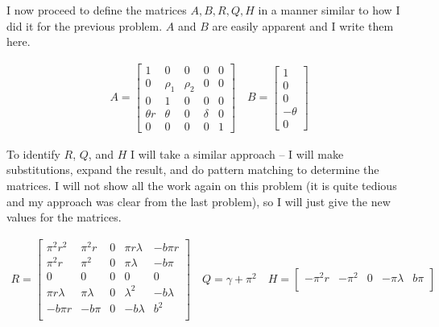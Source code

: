 \begin{homeworkProblem}[Problem 5.4]
{\begin{enumerate}[a.]
        I now proceed to define the matrices $A, B, R, Q, H$ in a manner similar to how I did it for the previous problem. $A$ and $B$ are easily apparent and I write them here.

        \begin{align} \label{eq:p4e4}
          A =
          \begin{bmatrix}
            1 & 0 & 0 &0 &0 \\
            0 & \rho_1 & \rho_2 & 0 &0 \\
            0 & 1 & 0 &0 & 0 \\
            \theta r & \theta & 0 & \delta & 0 \\
            0 & 0 & 0 & 0 & 1
          \end{bmatrix}
          \quad
          B =
          \begin{bmatrix}
            1\\
            0\\
            0\\
            -\theta \\
            0
          \end{bmatrix}
        \end{align}

        To identify $R$, $Q$, and $H$ I will take a similar approach -- I will make substitutions, expand the result, and do pattern matching to determine the matrices. I will not show all the work again on this problem (it is quite tedious and my approach was clear from the last problem), so I will just give the new values for the matrices.

        \begin{align} \label{eq:p3e5}
          R =
          \begin{bmatrix}
            \pi ^2 r^2 & \pi ^2 r & 0 & \pi  r \lambda  & -b \pi  r \\
             \pi ^2 r & \pi ^2 & 0 & \pi  \lambda  & -b \pi  \\
             0 & 0 & 0 & 0 & 0 \\
             \pi  r \lambda  & \pi  \lambda  & 0 & \lambda ^2 & -b \lambda  \\
             -b \pi  r & -b \pi  & 0 & -b \lambda  & b^2 \\
          \end{bmatrix}
          \quad
          Q = \gamma +\pi ^2
          \quad
          H = \begin{bmatrix} -\pi ^2 r & -\pi ^2 & 0 & -\pi  \lambda  & b \pi  \\ \end{bmatrix}
        \end{align}


\end{enumerate}}
\end{homeworkProblem}
